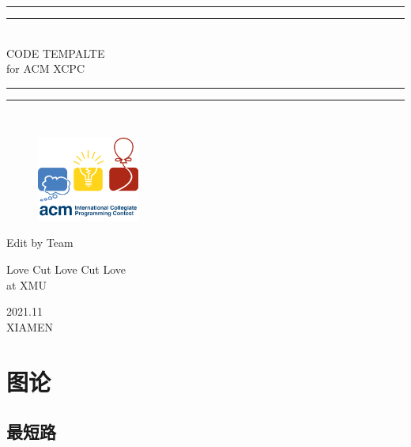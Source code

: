 \documentclass[a4paper,11pt,twoside,fontset = fandol,UTF8]{ctexbook}
\newcommand{\emptyPage}{\null\thispagestyle{empty}\addtocounter{page}{-1}\newpage}
\begin{document}
  \begin{titlepage}       %
    \centering
    \vspace*{\baselineskip}
    \rule{\textwidth}{1.6pt}
    \vspace*{-\baselineskip}
    \vspace*{2pt}
    \rule{\textwidth}{0.4pt}\\[\baselineskip]{\LARGE CODE TEMPALTE\\[\baselineskip]\small for ACM XCPC}
    \\[0.2\baselineskip]
    \rule{\textwidth}{0.4pt}\vspace*{-\baselineskip}\vspace{3.2pt}
    \rule{\textwidth}{1.6pt}\\[\baselineskip]
    \scshape

    \begin{figure}[!htb]
        \centering
        \includegraphics[width=0.3\textwidth]{icpc}    %
    \end{figure}

    \vspace*{3\baselineskip}
    Edit by Team\\
    [\baselineskip]
    {\Large {}  \par}
    {\Large Love Cut Love Cut Love \\ \normalsize{at XMU}\par}
    \vfill
    {\scshape 2021.11}\\{\large XIAMEN}\par
  \end{titlepage}

  \emptyPage

  \setcounter{page}{1}
  \tableofcontents

  \newpage
  \setcounter{page}{1}

  \chapter{图论}
  \setcounter{page}{1}
  \section{最短路}
\end{document}
